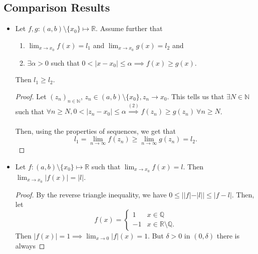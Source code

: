 \documentclass{article}
\newcommand{\Q}{\mathbb{Q}}
\newcommand{\R}{\mathbb{R}}
\newcommand{\N}{\mathbb{N}}
\newcommand{\seq}[2]{(#1_{#2})_{#2 \in \N}}
\newcommand{\?}{\stackrel{?}{=}}
\theoremstyle{definition} %
\begin{document}
\subsection{Comparison Results}

\begin{itemize}
    \item[]
          \begin{lemma}
              Let $f, g: (a, b) \setminus\{x_0\} \mapsto \R$. Assume further that
              \begin{enumerate}[label=(\arabic*)]
                  \item $\lim_{x \to x_0} f(x) = l_1$ and $\lim_{x \to x_0} g(x) = l_2$ and
                  \item $\exists \alpha > 0$ such that $0 < |x - x_0| \leq \alpha \implies f(x) \geq g(x)$.
              \end{enumerate}
              Then $l_1 \geq l_2$.
              \label{lemma:three_four_one}
          \end{lemma}
          \begin{proof}
              Let $\seq{z}{n}$, $z_n \in (a, b) \setminus\{x_0\}, z_n \rightarrow x_0$. This tells us that $\exists N \in \N$ such that $\forall n \geq N, 0 < |z_n - x_0| \leq \alpha \overset{(2)}{\implies} f(z_n) \geq g(z_n) \ \forall n \geq N$. \\\\
              Then, using the properties of sequences, we get that
              $$l_1 = \lim_{n \to \infty} f(z_n) \geq \lim_{n \to \infty} g(z_n) = l_2.$$
          \end{proof}
    \item[]
          \begin{lemma}
              Let $f: (a, b) \setminus \{x_0\} \mapsto \R$ such that $\lim_{x \to x_0} f(x) = l$. Then $\lim_{x \to x_0} |f(x)| = |l|$.
          \end{lemma}
          \begin{proof}
              By the reverse triangle inequality, we have $0 \leq ||f| - |l|| \leq |f - l|$. Then, let
              \[
                  f(x) =
                  \begin{cases}
                      1  & x \in \Q               \\
                      -1 & x \in \R \setminus \Q.
                  \end{cases}
              \]
              Then $|f(x)| = 1 \implies \lim_{x \to 0} |f|(x) = 1$. But $\delta > 0$ in $(0, \delta)$ there is always

\end{proof}
\end{itemize}
\end{document}
